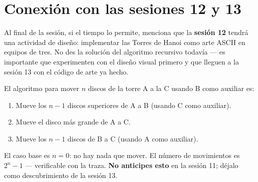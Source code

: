 \documentclass[12pt, oneside]{article}
\begin{document}
\section{Conexión con las sesiones 12 y 13}

\begin{notaprofesor}
  Al final de la sesión, si el tiempo lo permite, menciona que la
  \textbf{sesión 12} tendrá una actividad de diseño: implementar las
  Torres de Hanoi como arte ASCII en equipos de tres.  No des la solución
  del algoritmo recursivo todavía — es importante que experimenten con el
  diseño visual primero y que lleguen a la sesión 13 con el código de arte
  ya hecho.

  El algoritmo para mover $n$ discos de la torre A a la C usando B como
  auxiliar es:
  \begin{enumerate}
    \item Mueve los $n-1$ discos superiores de A a B (usando C como auxiliar).
    \item Mueve el disco más grande de A a C.
    \item Mueve los $n-1$ discos de B a C (usando A como auxiliar).
  \end{enumerate}

  El caso base es $n = 0$: no hay nada que mover.
  El número de movimientos es $2^n - 1$ — verificable con la traza.
  \textbf{No anticipes esto} en la sesión 11; déjalo como descubrimiento
  de la sesión 13.
\end{notaprofesor}
\end{document}
